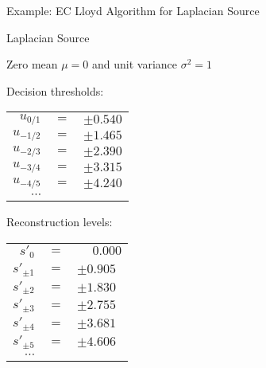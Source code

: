 

\begin{frame}{Example: EC Lloyd Algorithm for Laplacian Source}
\vspace{-0.5ex}
  \begin{minipage}{0.5\linewidth}
    Laplacian Source
    \bit
  \item Zero mean $\mu=0$ and unit variance $\sigma^2=1$
      \eit

      \medskip\medskip
{}
\bit\TabPositions{10em}
\item Decision thresholds:\tab\hspace{-2.0ex}%
  {\small\begin{tabular}[t]{r@{\;\;}c@{\;\;}l}
  $u_{0/1}$  &$=$& $\pm0.540$\\
  $u_{-1/2}$ &$=$& $\pm1.465$\\
  $u_{-2/3}$ &$=$& $\pm2.390$\\
  $u_{-3/4}$ &$=$& $\pm3.315$\\
  $u_{-4/5}$ &$=$& $\pm4.240$\\
  $\cdots$
  \end{tabular}}
\item Reconstruction levels:\tab
  {\small\begin{tabular}[t]{r@{\;\;}c@{\;\;}l}
  $s'_0$     &$=$& $\phantom{\pm}0.000$\\[.2ex]
  $s'_{\pm1}$ &$=$& $\pm0.905$\\
  $s'_{\pm2}$ &$=$& $\pm1.830$\\
  $s'_{\pm3}$ &$=$& $\pm2.755$\\
  $s'_{\pm4}$ &$=$& $\pm3.681$\\
  $s'_{\pm5}$ &$=$& $\pm4.606$\\
  $\cdots$
  \end{tabular}}
  \eit
  \end{minipage}%
  \begin{minipage}{0.5\linewidth}
    \begin{center}
    \hfitbox{\linewidth}{%
  \begin{tikzpicture}
     \begin{axis}[
        compat=newest,
        width=9cm,height=6.5cm,
        axis lines=none,
        xmin=-5,xmax=5,ymin=-0.15,ymax=0.75,
        clip mode=individual, %
        after end axis/.code={
          \draw[->,style={-{Latex[length=2.5mm,width=1.2mm]},line width=0.5pt}] 
               (axis cs: -5,0) -- (axis cs: 5,0);
}
\end{axis}
\end{tikzpicture}}
\end{center}
\end{minipage}
\end{frame}
